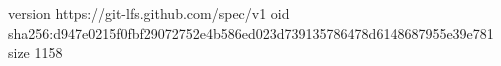version https://git-lfs.github.com/spec/v1
oid sha256:d947e0215f0fbf29072752e4b586ed023d739135786478d6148687955e39e781
size 1158
